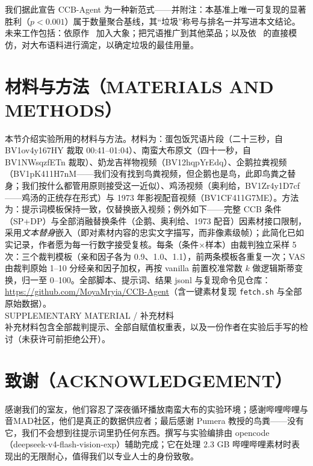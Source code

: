 \documentclass[journal]{IEEEtran}
\begin{document}
我们据此宣告 CCB-Agent 为一种新范式——并附注：本基准上唯一可复现的显著胜利（$p<0.001$）属于数量聚合基线，其“垃圾”称号与排名一并写进本文结论。未来工作包括：依原作~\cite{moegirl2026} 加入大象；把咒语推广到其他菜品；以及依~\cite{pumera2020} 的直接模仿，对大布语料进行滴定，以确定垃圾的最佳用量。


\section{材料与方法（MATERIALS AND METHODS）}

本节介绍实验所用的材料与方法。材料为：蛋包饭咒语片段（二十三秒，自 BV1ov4y167HY 裁取 00:41--01:04）、南蛮大布原文（四十一秒，自 BV1NWsqzfETn 裁取）、奶龙吉祥物视频（BV12hqpYrEdq）、企鹅拉粪视频（BV1pK411H7nM——我们没有找到鸟粪视频，但企鹅也是鸟，此即鸟粪之替身；我们按什么都管用原则接受这一近似）、鸡汤视频（奥利给，BV1Zr4y1D7cf——鸡汤的正统存在形式）与 1973 年影视配音视频（BV1CF411G7ME）。方法为：提示词模板保持一致，仅替换嵌入视频；例外如下——完整 CCB 条件（SP+DP）与全部消融替换条件（企鹅、奥利给、1973 配音）因素材接口限制，采用\emph{文本替身}嵌入（即对素材内容的忠实文字描写，而非像素级帧）；此简化已如实记录，作者愿为每一行数字接受复核。每条（条件×样本）由裁判独立采样 5 次：三个裁判模板（亲和因子各为 0.9、1.0、1.1），前两条模板各重复一次；VAS 由裁判原始 1--10 分经亲和因子加权，再按 vanilla 前置校准常数 $k$ 做逻辑斯蒂变换，归一至 0--100。全部脚本、提示词、结果 jsonl 与复现命令见仓库：\url{https://github.com/MoyaMryia/CCB-Agent}（含一键素材复现 \texttt{fetch.sh} 与全部原始数据）。\\

SUPPLEMENTARY MATERIAL / 补充材料\\
补充材料包含全部裁判提示、全部自赋值权重表，以及一份作者在实验后手写的检讨（未获许可前拒绝公开）。

\section{致谢（ACKNOWLEDGEMENT）}

感谢我们的室友，他们容忍了深夜循环播放南蛮大布的实验环境；感谢哔哩哔哩与音MAD社区，他们是真正的数据供应者；最后感谢 Pumera 教授的鸟粪——没有它，我们不会想到往提示词里扔任何东西。撰写与实验编排由 opencode（deepseek-v4-flash-vision-exp）辅助完成；它在处理 2.3 GB 哔哩哔哩素材时表现出的无限耐心，值得我们以专业人士的身份致敬。
\end{document}
